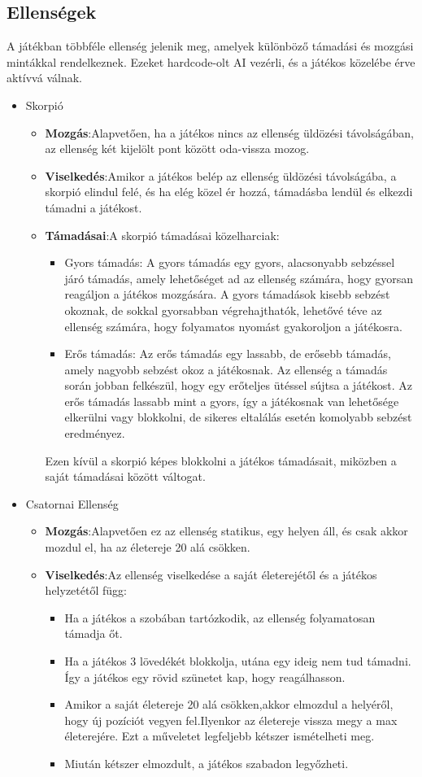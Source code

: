 \documentclass[
]{thesis-ekf}
\theoremstyle{definition}
\theoremstyle{remark}
\begin{document}
\subsection{Ellenségek}

A játékban többféle ellenség jelenik meg, amelyek különböző támadási és mozgási mintákkal rendelkeznek. Ezeket hardcode-olt AI vezérli, és a játékos közelébe érve aktívvá válnak.
\begin{itemize}
	\item Skorpió
	\begin{itemize}
		\item \textbf{Mozgás}:Alapvetően, ha a játékos nincs az ellenség üldözési távolságában, az ellenség két kijelölt pont között oda-vissza mozog.
		\item \textbf{Viselkedés}:Amikor a játékos belép az ellenség üldözési távolságába, a skorpió elindul felé, és ha elég közel ér hozzá, támadásba lendül és elkezdi támadni a játékost.
		\item \textbf{Támadásai}:A skorpió támadásai közelharciak:
		\begin{itemize}
			\item Gyors támadás: A gyors támadás egy gyors, alacsonyabb sebzéssel járó támadás, amely lehetőséget ad az ellenség számára, hogy gyorsan reagáljon a játékos mozgására. A gyors támadások kisebb sebzést okoznak, de sokkal gyorsabban végrehajthatók, lehetővé téve az ellenség számára, hogy folyamatos nyomást gyakoroljon a játékosra. 
			\item Erős támadás: Az erős támadás egy lassabb, de erősebb támadás, amely nagyobb sebzést okoz a játékosnak. Az ellenség a támadás során jobban felkészül, hogy egy erőteljes ütéssel sújtsa a játékost. Az erős támadás lassabb mint a gyors, így a játékosnak van lehetősége elkerülni vagy blokkolni, de sikeres eltalálás esetén komolyabb sebzést eredményez.
		\end{itemize}
		Ezen kívül a skorpió képes blokkolni a játékos támadásait, miközben a saját támadásai között váltogat.
	\end{itemize}
	\item Csatornai Ellenség
	\begin{itemize}
		\item \textbf{Mozgás}:Alapvetően ez az ellenség statikus, egy helyen áll, és csak akkor mozdul el, ha az életereje 20 alá csökken.
		\item \textbf{Viselkedés}:Az ellenség viselkedése a saját életerejétől és a játékos helyzetétől függ:
		\begin{itemize}
			\item Ha a játékos a szobában tartózkodik, az ellenség folyamatosan támadja őt.
			\item Ha a játékos 3 lövedékét blokkolja, utána egy ideig nem tud támadni. Így a játékos egy rövid szünetet kap, hogy reagálhasson.
			\item Amikor a saját életereje 20 alá csökken,akkor elmozdul a helyéről, hogy új pozíciót vegyen fel.Ilyenkor az életereje vissza megy a max életerejére. Ezt a műveletet legfeljebb kétszer ismételheti meg.
			\item Miután kétszer elmozdult, a játékos szabadon legyőzheti.
			

\end{itemize}
\end{itemize}
\end{itemize}
\end{document}
